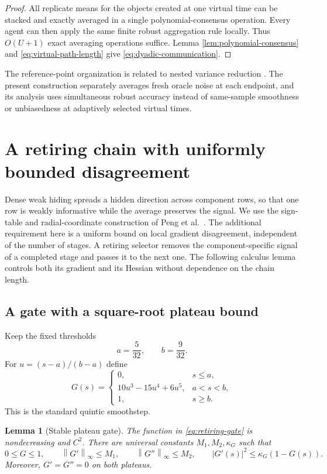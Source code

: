 \documentclass[11pt,a4paper]{article}
\newcommand{\norm}[1]{\left\lVert #1\right\rVert}
\newtheorem{lemma}[theorem]{Lemma}
\theoremstyle{remark}
\begin{document}
\begin{proof}
All replicate means for the objects created at one virtual time can be
stacked and exactly averaged in a single polynomial-consensus operation.
Every agent can then apply the same finite robust aggregation rule locally.
Thus $O(U+1)$ exact averaging operations suffice.  Lemma
\ref{lem:polynomial-consensus} and \eqref{eq:virtual-path-length} give
\eqref{eq:dyadic-communication}.
\end{proof}

The reference-point organization is related to nested variance reduction
\cite{snvrg2018}.  The present construction separately averages fresh oracle
noise at each endpoint, and its analysis uses simultaneous robust accuracy
instead of same-sample smoothness or unbiasedness at adaptively selected
virtual times.

\section{A retiring chain with uniformly bounded disagreement}
\label{subsec:retiring-dwh}

Dense weak hiding spreads a hidden direction across component rows, so that
one row is weakly informative while the average preserves the signal.
We use the sign-table and radial-coordinate construction of
Peng et al.~\cite{dense2026}. The additional requirement here is a uniform
bound on local gradient disagreement, independent of the number of stages.
A retiring selector removes the component-specific signal of a completed
stage and passes it to the next one. The following calculus lemma controls
both its gradient and its Hessian without dependence on the chain length.

\subsection{A gate with a square-root plateau bound}

Keep the fixed thresholds
\[
 a=\frac5{32},\qquad b=\frac9{32}.
\]
For $u=(s-a)/(b-a)$ define
\begin{equation}
 G(s)=
 \begin{cases}
 0,&s\le a,\\
 10u^3-15u^4+6u^5,&a<s<b,\\
 1,&s\ge b.
 \end{cases}
 \label{eq:retiring-gate}
\end{equation}
This is the standard quintic smoothstep.

\begin{lemma}[Stable plateau gate]
\label{lem:stable-gate}
The function in \eqref{eq:retiring-gate} is nondecreasing and $C^2$.  There
are universal constants $M_1,M_2,\kappa_G$ such that
\begin{equation}
 0\le G\le1,\qquad
 \norm{G'}_\infty\le M_1,\qquad
 \norm{G''}_\infty\le M_2,\qquad
 |G'(s)|^2\le\kappa_G(1-G(s)).
 \label{eq:gate-square-root}
\end{equation}
Moreover, $G'=G''=0$ on both plateaus.
\end{lemma}
\end{document}
